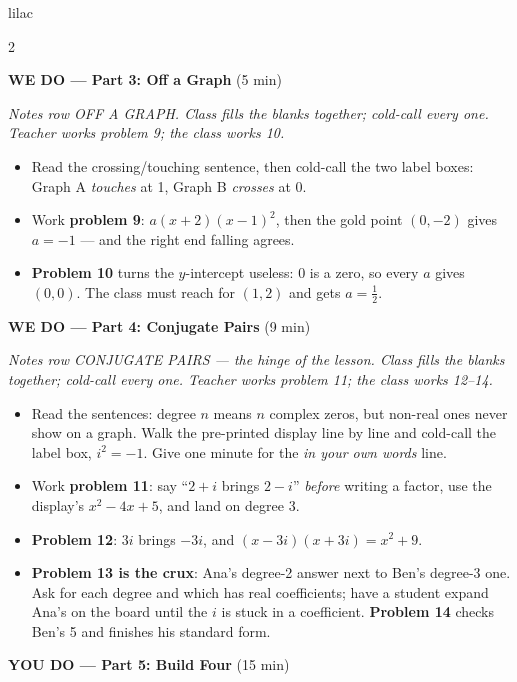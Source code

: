 \documentclass[10pt]{article}
\begin{document}
\begin{skillbox}{lilac}
\begin{multicols}{2}
\columnbreak

\textbf{WE DO --- Part 3: Off a Graph} (5 min)

\textit{Notes row OFF A GRAPH. Class fills the blanks together; cold-call every one. Teacher
works problem 9; the class works 10.}
\begin{itemize}
  \item Read the crossing/touching sentence, then cold-call the two label boxes: Graph A
        \textit{touches} at 1, Graph B \textit{crosses} at 0.
  \item Work \textbf{problem 9}: $a(x + 2)(x - 1)^2$, then the gold point $(0, -2)$ gives
        $a = -1$ --- and the right end falling agrees.
  \item \textbf{Problem 10} turns the $y$-intercept useless: $0$ is a zero, so every $a$ gives
        $(0, 0)$. The class must reach for $(1, 2)$ and gets $a = \tfrac12$.
\end{itemize}

\textbf{WE DO --- Part 4: Conjugate Pairs} (9 min)

\textit{Notes row CONJUGATE PAIRS --- the hinge of the lesson. Class fills the blanks together;
cold-call every one. Teacher works problem 11; the class works 12--14.}
\begin{itemize}
  \item Read the sentences: degree $n$ means $n$ complex zeros, but non-real ones never show on
        a graph. Walk the pre-printed display line by line and cold-call the label box,
        $i^2 = -1$. Give one minute for the \textit{in your own words} line.
  \item Work \textbf{problem 11}: say ``$2 + i$ brings $2 - i$'' \emph{before} writing a
        factor, use the display's $x^2 - 4x + 5$, and land on degree 3.
  \item \textbf{Problem 12}: $3i$ brings $-3i$, and $(x - 3i)(x + 3i) = x^2 + 9$.
  \item \textbf{Problem 13 is the crux}: Ana's degree-2 answer next to Ben's degree-3 one. Ask
        for each degree and which has real coefficients; have a student expand Ana's on the
        board until the $i$ is stuck in a coefficient. \textbf{Problem 14} checks Ben's 5 and
        finishes his standard form.
\end{itemize}

\textbf{YOU DO --- Part 5: Build Four} (15 min)


\end{multicols}
\end{skillbox}
\end{document}
